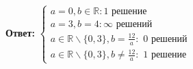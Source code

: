 \documentclass[a4paper]{article}
\renewcommand{\f}[2]{\frac{#1}{#2}}
\newcommand{\RR}{\mathbb{R}}
\begin{document}
\begin{enumerate}
    \textbf{Ответ: }$\begin{cases}
        a=0, b\in \RR : \text{1 решение}\\
        a=3, b=4 : \infty \text{ решений}\\
        a\in \RR \smallsetminus \{0, 3\},b=\f{12}{a} : \text{ 0 решений}\\
        a\in \RR \smallsetminus \{0, 3\}, b\neq\f{12}{a}: \text{ 1 решение} 
    \end{cases}$
\end{enumerate}
\end{document}
